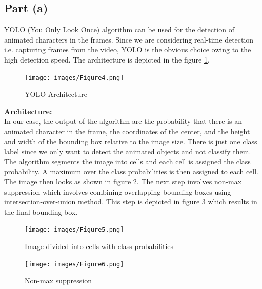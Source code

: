 \documentclass[twosided]{article}
\begin{document}
\subsection{Part (a)}
YOLO (You Only Look Once) algorithm \cite{YOLO} can be used for the detection of animated characters in the frames. Since we are considering real-time detection i.e. capturing frames from the video, YOLO is the obvious choice owing to the high detection speed. The architecture is depicted in the figure \ref{fig:figure4}. \\

\begin{figure}[h]
    \centering
    \texttt{[image: images/Figure4.png]}
    \caption{YOLO Architecture}
    \label{fig:figure4}
\end{figure}

\newpage

\textbf{Architecture:} \\
In our case, the output of the algorithm are the probability that there is an animated character in the frame, the coordinates of the center, and the height and width of the bounding box relative to the image size. There is just one class label since we only want to detect the animated objects and not classify them. The algorithm segments the image into cells and each cell is assigned the class probability. A maximum over the class probabilities is then assigned to each cell. The image then looks as shown in figure \ref{fig:figure5}. The next step involves non-max suppression which involves combining overlapping bounding boxes using intersection-over-union method. This step is depicted in figure \ref{fig:figure6} which results in the final bounding box. \\

\begin{figure}[h]
    \centering
    \texttt{[image: images/Figure5.png]}
    \caption{Image divided into cells with class probabilities}
    \label{fig:figure5}
\end{figure}

\begin{figure}[h]
    \centering
    \texttt{[image: images/Figure6.png]}
    \caption{Non-max suppression}
    \label{fig:figure6}
\end{figure}
\end{document}
